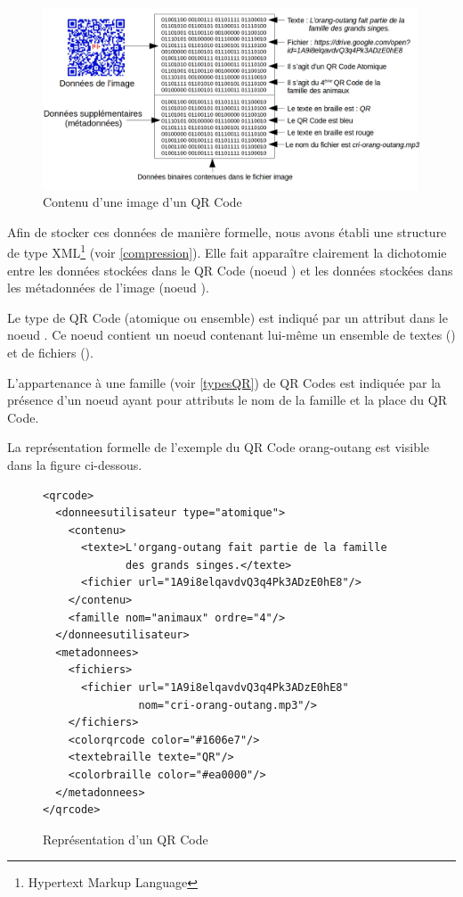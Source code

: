 \begin{figure}[!h]
	\centering
   \includegraphics[scale=0.33]{img/schema_representation_donnees.png}
   \caption{Contenu d'une image d'un QR Code}
\end{figure}

\newpage
\par
Afin de stocker ces données de manière formelle, nous avons établi une structure de type XML\footnote{Hypertext Markup Language} (voir \ref{compression}). Elle fait apparaître clairement la dichotomie entre les données stockées dans le QR Code (noeud ) et les données stockées dans les métadonnées de l'image (noeud ).
\par
Le type de QR Code (atomique ou ensemble) est indiqué par un attribut dans le noeud . Ce noeud contient un noeud  contenant lui-même un ensemble de textes () et de fichiers ().
\par
L'appartenance à une famille (voir \ref{typesQR}) de QR Codes est indiquée par la présence d'un noeud  ayant pour attributs le nom de la famille et la place du QR Code.
\par
La représentation formelle de l'exemple du QR Code orang-outang est visible dans la figure ci-dessous.

\begin{figure}[!h]
\begin{adjustbox}{minipage=\textwidth,bgcolor={RGB}{240 240 240}}

\lstset{language=XML}

\begin{lstlisting}
<qrcode>
  <donneesutilisateur type="atomique">
    <contenu>
      <texte>L'organg-outang fait partie de la famille 
             des grands singes.</texte>
      <fichier url="1A9i8elqavdvQ3q4Pk3ADzE0hE8"/>
    </contenu>
    <famille nom="animaux" ordre="4"/>
  </donneesutilisateur>
  <metadonnees>
    <fichiers>
      <fichier url="1A9i8elqavdvQ3q4Pk3ADzE0hE8" 
               nom="cri-orang-outang.mp3"/>
    </fichiers>
    <colorqrcode color="#1606e7"/>
    <textebraille texte="QR"/>
    <colorbraille color="#ea0000"/>
  </metadonnees>
</qrcode>
\end{lstlisting}

\end{adjustbox}
\caption{Représentation d'un QR Code}

\end{figure}\textbf{}